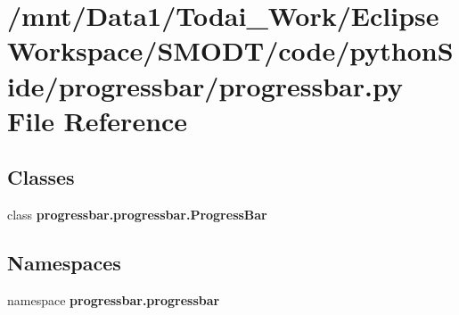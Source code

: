 \section{/mnt/\-Data1/\-Todai\-\_\-\-Work/\-Eclipse\-Workspace/\-S\-M\-O\-D\-T/code/python\-Side/progressbar/progressbar.py File Reference}
\label{progressbar_8py}
\subsection*{Classes}
\begin{DoxyCompactItemize}
\item 
class {\bf progressbar.\-progressbar.\-Progress\-Bar}
\end{DoxyCompactItemize}
\subsection*{Namespaces}
\begin{DoxyCompactItemize}
\item 
namespace {\bf progressbar.\-progressbar}
\end{DoxyCompactItemize}
